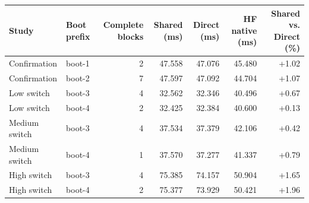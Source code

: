 \begin{tabular}{llrrrrr}
\toprule
Study & Boot prefix & Complete blocks & Shared (ms) & Direct (ms) & HF native (ms) & Shared vs. Direct (\%)\\
\midrule
Confirmation & boot-1 & 2 & 47.558 & 47.076 & 45.480 & +1.02\\
Confirmation & boot-2 & 7 & 47.597 & 47.092 & 44.704 & +1.07\\
Low switch & boot-3 & 4 & 32.562 & 32.346 & 40.496 & +0.67\\
Low switch & boot-4 & 2 & 32.425 & 32.384 & 40.600 & +0.13\\
Medium switch & boot-3 & 4 & 37.534 & 37.379 & 42.106 & +0.42\\
Medium switch & boot-4 & 1 & 37.570 & 37.277 & 41.337 & +0.79\\
High switch & boot-3 & 4 & 75.385 & 74.157 & 50.904 & +1.65\\
High switch & boot-4 & 2 & 75.377 & 73.929 & 50.421 & +1.96\\
\bottomrule
\end{tabular}
